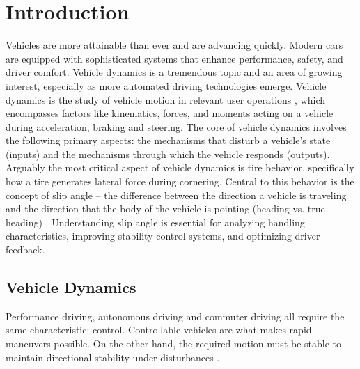 \documentclass[12pt]{article}
\begin{document}
    \tableofcontents
    
    \newpage

    \section{Introduction}
        
    Vehicles are more attainable than ever and are advancing quickly. Modern cars 
    are equipped with sophisticated systems that enhance performance, safety, and driver 
    comfort. Vehicle dynamics is a tremendous topic and an area of growing interest, especially 
    as more automated driving technologies emerge. Vehicle dynamics is the study of vehicle 
    motion in relevant user operations \autocite{Jacobson_2016}, which encompasses factors like kinematics, forces, 
    and moments acting on a vehicle during acceleration, braking and steering. The core of vehicle 
    dynamics involves the following primary aspects: the mechanisms that disturb a vehicle’s state 
    (inputs) and the mechanisms through which the vehicle responds (outputs). Arguably the most 
    critical aspect of vehicle dynamics is tire behavior, specifically how a tire generates lateral 
    force during cornering. Central to this behavior is the concept of slip angle – the difference 
    between the direction a vehicle is traveling and the direction that the body of the vehicle is 
    pointing (heading vs. true heading) \autocite{Racelogic_2015}. Understanding slip angle is essential for analyzing 
    handling characteristics, improving stability control systems, and optimizing driver feedback.
        
        \subsection{Vehicle Dynamics}

        Performance driving, autonomous driving and commuter driving all require the same characteristic: 
        control. Controllable vehicles are what makes rapid maneuvers possible. On the other hand, the required 
        motion must be stable to maintain directional stability under disturbances \autocite{MMM}. 
\end{document}
